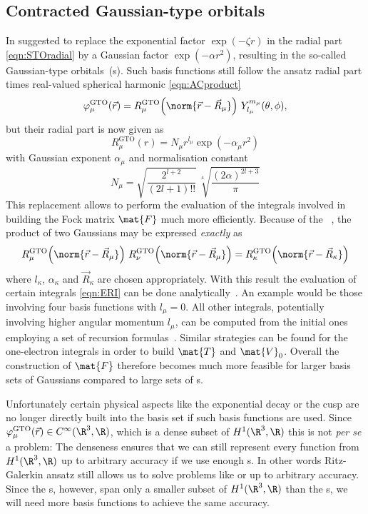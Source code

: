 \subsection{Contracted Gaussian-type orbitals}
\label{sec:cGTO}

In \citeyear{Boys1950} \citeauthor{Boys1950} suggested to replace
the exponential factor $\exp(- \zeta r)$ in the radial part \eqref{eqn:STOradial}
by a Gaussian factor $\exp(-\alpha r^2)$,
resulting in the so-called Gaussian-type orbitals~({\GTO}s).
Such \GTO basis functions still follow the ansatz radial part times real-valued spherical harmonic
\eqref{eqn:ACproduct}
\begin{equation}
	\varphi^\text{GTO}_\mu(\vec{r}) = R^\text{GTO}_\mu\!\left(\norm{\vec{r} - \vec{R}_\mu}\right)
	\, Y_{l_\mu}^{m_\mu}(\theta, \phi),
	\label{eqn:ACproduct}
\end{equation}
but their radial part is now given as
\begin{equation}
	R^\text{GTO}_\mu(r) = N_\mu r^{l_\mu} \exp(-\alpha_\mu r^2)
	\label{eqn:GTOradial}
\end{equation}
with Gaussian exponent $\alpha_\mu$ and normalisation constant
\[
	N_\mu =  \sqrt{\frac{2^{l+2}}{(2l+1)!!}} \, \sqrt[4]{\frac{(2\alpha)^{2l+3}}{\pi}}
\]
This replacement allows to perform the
evaluation of the integrals involved in building the Fock matrix $\mat{F}$
much more efficiently.
Because of the %
~\cite{Boys1950,Szabo1996,Besalu2011},
the product of two Gaussians may be expressed \emph{exactly} as
\[
	R^\text{GTO}_\mu\!\left( \norm{\vec{r} - \vec{R}_\mu}\right)
	\,
	R^\text{GTO}_\nu\!\left( \norm{\vec{r} - \vec{R}_\mu}\right)
	= R^\text{GTO}_\kappa\!\left( \norm{\vec{r} - \vec{R}_\kappa}\right)
\]
where $l_\kappa$, $\alpha_\kappa$ and $\vec{R}_\kappa$ are chosen appropriately.
With this result the evaluation of certain \ERI integrals \eqref{eqn:ERI}
can be done analytically~\cite{Boys1950}.
An example would be those involving four basis functions with $l_\mu = 0$.
All other \ERI integrals, potentially involving higher angular momentum $l_\mu$,
can be computed from the initial ones employing
a set of recursion formulas~\cite{Gill1994}.
Similar strategies can be found for the one-electron integrals
in order to build $\mat{T}$ and $\mat{V}_0$.
Overall the construction of $\mat{F}$ therefore becomes much more
feasible for larger basis sets of Gaussians compared to large sets of {\STO}s.

Unfortunately certain physical aspects like the exponential decay
or the cusp are no longer directly built into the basis set
if such \GTO basis functions are used.
Since $\varphi^\text{GTO}_\mu(\vec{r}) \in C^\infty(\R^3, \R)$,
which is a dense subset of $H^1(\R^3, \R)$
this is not \textit{per se} a problem:
The denseness ensures that we can still represent every function
from $H^1(\R^3, \R)$ up to arbitrary accuracy if we use enough {\GTO}s.
In other words Ritz-Galerkin ansatz still allows us to
solve problems like \HF or \FCI up to arbitrary accuracy.
Since the {\GTO}s, however,
span only a smaller subset of $H^1(\R^3, \R)$ than the {\STO}s,
we will need more \GTO basis functions to achieve the same accuracy.


